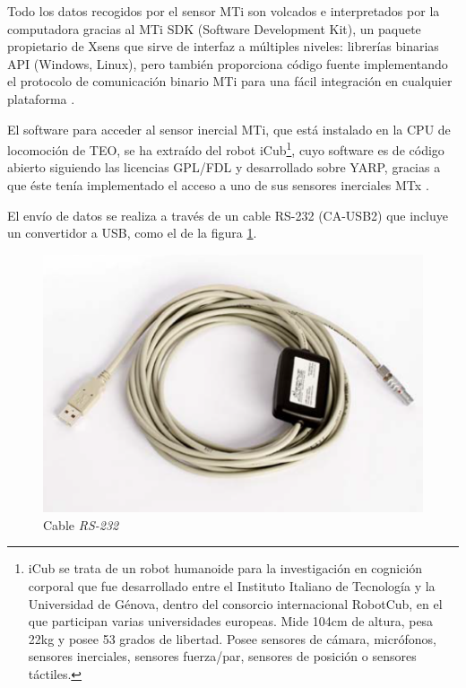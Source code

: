 Todo los datos recogidos por el sensor MTi son volcados e interpretados por la computadora gracias al MTi SDK (Software Development Kit), un paquete propietario de Xsens que sirve de interfaz a múltiples niveles: librerías binarias API%
(Windows, Linux), pero también proporciona código fuente implementando el protocolo de comunicación binario MTi para una fácil integración en cualquier plataforma \cite{ref12}.


El software para acceder al sensor inercial MTi, que está instalado en la CPU de locomoción de TEO, se ha extraído del robot iCub\footnote{iCub se trata de un robot humanoide para la investigación en cognición corporal que fue desarrollado entre el Instituto Italiano de Tecnología y la Universidad de Génova, dentro del consorcio internacional RobotCub, en el que participan varias universidades europeas. Mide 104cm de altura, pesa 22kg y posee 53 grados de libertad. Posee sensores de cámara, micrófonos, sensores inerciales, sensores fuerza/par, sensores de posición o sensores táctiles.}, cuyo software es de código abierto siguiendo las licencias GPL/FDL y desarrollado sobre YARP, gracias a que éste tenía implementado el acceso a uno de sus sensores inerciales MTx \cite{ref32}.

\newpage

El envío de datos se realiza a través de un cable RS-232 (CA-USB2) que incluye un convertidor a USB, como el de la figura \ref{figura39}.

\begin{figure}[H]
\centering
\includegraphics[scale=0.6]{imagenes/apartado_3/39_cable_rs_232}
\caption{Cable \textsl{RS-232}}
\label{figura39}
\end{figure}

\afterpage{\null\newpage}
\newpage